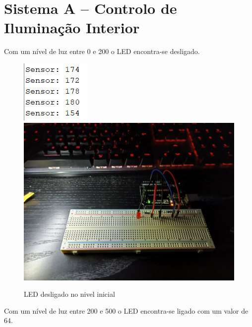 \section{Sistema A – Controlo de Iluminação Interior}

Com um nível de luz entre 0 e 200 o LED encontra-se desligado.


\begin{figure}[H]
    \centering
    \includegraphics[scale=1.1]{images/testes/SisA_SerialMonitor0FF_original.png}
    \includegraphics[scale=0.03]{images/testes/sisA_Off.jpg}
    \caption{LED desligado no nivel inicial}
\end{figure}


Com um nível de luz entre 200 e 500 o LED encontra-se ligado com um valor de 64.

